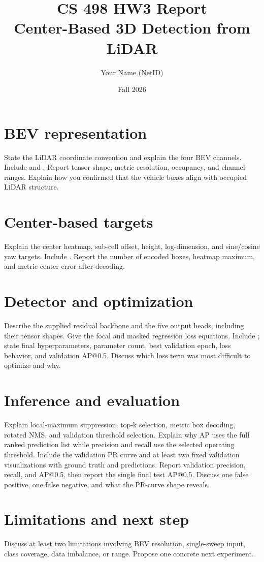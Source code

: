 \documentclass[11pt]{article}
\title{CS 498 HW3 Report\\Center-Based 3D Detection from LiDAR}
\author{Your Name (NetID)}
\date{Fall 2026}
\begin{document}
\maketitle

\section{BEV representation}
State the LiDAR coordinate convention and explain the four BEV channels.
Include  and . Report tensor shape,
metric resolution, occupancy, and channel ranges. Explain how you confirmed
that the vehicle boxes align with occupied LiDAR structure.

\section{Center-based targets}
Explain the center heatmap, sub-cell offset, height, log-dimension, and
sine/cosine yaw targets. Include . Report the number
of encoded boxes, heatmap maximum, and metric center error after decoding.

\section{Detector and optimization}
Describe the supplied residual backbone and the five output heads, including
their tensor shapes. Give the focal and masked regression loss equations.
Include ; state final hyperparameters, parameter
count, best validation epoch, loss behavior, and validation AP@0.5. Discuss
which loss term was most difficult to optimize and why.

\section{Inference and evaluation}
Explain local-maximum suppression, top-k selection, metric box decoding,
rotated NMS, and validation threshold selection. Explain why AP uses the full
ranked prediction list while precision and recall use the selected operating
threshold. Include the validation PR curve and at least two fixed validation
visualizations with ground truth and predictions. Report validation precision,
recall, and AP@0.5, then report the
single final test AP@0.5. Discuss one false positive, one false negative, and
what the PR-curve shape reveals.

\section{Limitations and next step}
Discuss at least two limitations involving BEV resolution, single-sweep input,
class coverage, data imbalance, or range. Propose one concrete next experiment.
\end{document}
